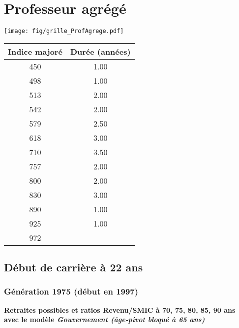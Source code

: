 \newpage 
 
\chapter{Professeur agrégé} 

\begin{minipage}{0.55\linewidth}\texttt{[image: fig/grille\_ProfAgrege.pdf]}\end{minipage} 
\begin{minipage}{0.3\linewidth} 
 \begin{center} 

\begin{tabular}[htb]{|c|c|} 
\hline 
 Indice majoré &  Durée (années) \\ 
\hline \hline 
 450 &  1.00 \\ 
\hline 
 498 &  1.00 \\ 
\hline 
 513 &  2.00 \\ 
\hline 
 542 &  2.00 \\ 
\hline 
 579 &  2.50 \\ 
\hline 
 618 &  3.00 \\ 
\hline 
 710 &  3.50 \\ 
\hline 
 757 &  2.00 \\ 
\hline 
 800 &  2.00 \\ 
\hline 
 830 &  3.00 \\ 
\hline 
 890 &  1.00 \\ 
\hline 
 925 &  1.00 \\ 
\hline 
 972 &   \\ 
\hline 
\hline 
\end{tabular} 
\end{center} 
 \end{minipage} 


 \addto{\captionsenglish}{ \renewcommand{\mtctitle}{}} \setcounter{minitocdepth}{2} 
 \minitoc \newpage 

\section{Début de carrière à 22 ans} 

\subsection{Génération 1975 (début en 1997)} 

{\bf \noindent Retraites possibles et ratios Revenu/SMIC à 70, 75, 80, 85, 90 ans avec le modèle \emph{Gouvernement (âge-pivot bloqué à 65 ans)}}  
 
